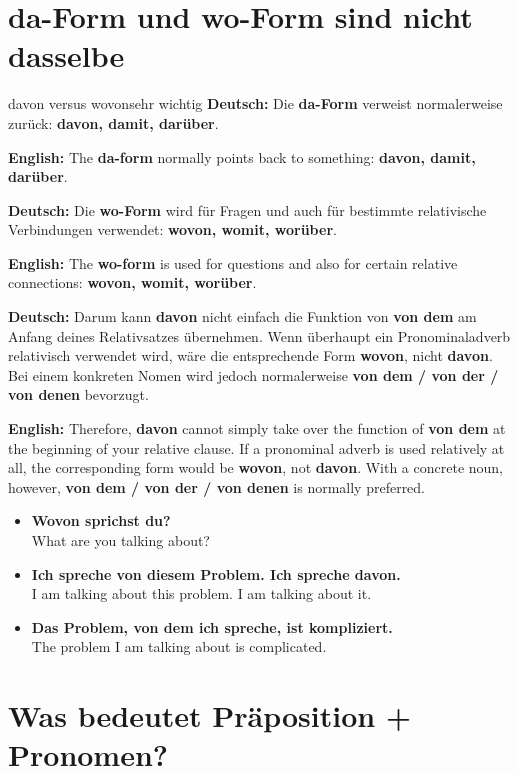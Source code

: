 \documentclass[a4paper,11pt]{article}
\newcommand{\GermanText}[1]{\textbf{Deutsch: }#1\par}
\newcommand{\EnglishText}[1]{{\small\color{SoftGray}\textbf{English: }#1\par}}
\newcommand{\ExampleItem}[2]{\item \textbf{#1}\\{\small\color{SoftGray}#2}}
\begin{document}
    \section{da-Form und wo-Form sind nicht dasselbe}

        \begin{grammarentry}{davon versus wovon}{sehr wichtig}
            \GermanText{Die \textbf{da-Form} verweist normalerweise zurück: \textbf{davon, damit, darüber}.}
            \EnglishText{The \textbf{da-form} normally points back to something: \textbf{davon, damit, darüber}.}

            \GermanText{Die \textbf{wo-Form} wird für Fragen und auch für bestimmte relativische Verbindungen verwendet: \textbf{wovon, womit, worüber}.}
            \EnglishText{The \textbf{wo-form} is used for questions and also for certain relative connections: \textbf{wovon, womit, worüber}.}

            \GermanText{Darum kann \textbf{davon} nicht einfach die Funktion von \textbf{von dem} am Anfang deines Relativsatzes übernehmen. Wenn überhaupt ein Pronominaladverb relativisch verwendet wird, wäre die entsprechende Form \textbf{wovon}, nicht \textbf{davon}. Bei einem konkreten Nomen wird jedoch normalerweise \textbf{von dem / von der / von denen} bevorzugt.}
            \EnglishText{Therefore, \textbf{davon} cannot simply take over the function of \textbf{von dem} at the beginning of your relative clause. If a pronominal adverb is used relatively at all, the corresponding form would be \textbf{wovon}, not \textbf{davon}. With a concrete noun, however, \textbf{von dem / von der / von denen} is normally preferred.}
        \end{grammarentry}

        \begin{exbox}
            \begin{itemize}
                \ExampleItem{Wovon sprichst du?}{What are you talking about?}
                \ExampleItem{Ich spreche von diesem Problem. Ich spreche davon.}{I am talking about this problem. I am talking about it.}
                \ExampleItem{Das Problem, von dem ich spreche, ist kompliziert.}{The problem I am talking about is complicated.}
            \end{itemize}
        \end{exbox}

    \section{Was bedeutet Präposition + Pronomen?}
\end{document}
